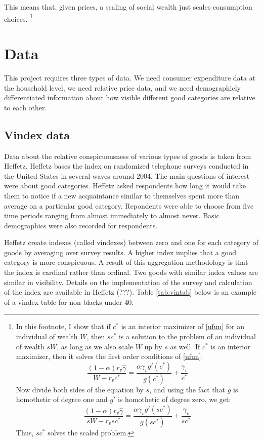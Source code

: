 \documentclass{article}
\begin{document}
This means that, given prices, a scaling of social wealth just scales consumption choices.
\footnote{
In this footnote, I show that if $c^*$ is an interior maximizer of \eqref{ufun} for an individual of wealth $W$, then $s c^*$ is a solution to the  problem of an individual of wealth $s W$, as long as we also scale $\underbar{W}$ up by $s$ as well.
If $c^*$ is an interior maximizer, then it solves the first order conditions of \eqref{ufun}:
\[
\frac{(1-\alpha)r_v \hat{\gamma}}{W-r_v c^*} = \frac{\alpha \gamma_v g'(c^*)}{g(c^*)} + \frac{\gamma_v}{c^*}
\]
Now divide both sides of the equation by $s$, and using the fact that $g$ is homothetic of degree one and $g'$ is homothetic of degree zero, we get:
\[
\frac{(1-\alpha)r_v \hat{\gamma}}{s W-r_v s c^*} = \frac{\alpha \gamma_v g'(s c^*)}{g(s c^*)} + \frac{\gamma_v}{s c^*}
\]
Thus, $s c^*$ solves the scaled problem.
}
\section{Data}
This project requires three types of data.  We need consumer expenditure data at the household level, we need relative price data, and we need demographicly differentiated information about how visible different good categories are relative to each other. 
\subsection{Vindex data}
Data about the relative  conspicuousness of  various types of goods is taken from Heffetz.  
Heffetz bases the index on randomized telephone surveys conducted in the United States in several waves around 2004.
The main questions of interest were about good categories.
Heffetz asked respondents how long it would take them to notice if a new acquaintance similar to themselves spent more than average on a particular good category.
Repondents were able to choose from five time periods ranging from almost immediately to almost never.  
Basic demographics were also recorded for respondents.  

Heffetz create indexes (called vindexes) between zero and one for each category of goods by averaging over survey results.  
A higher index implies that a good category is  more conspicuous. 
A result of this aggregation methodology is that the index is cardinal rather than ordinal.  Two goods with similar index values are similar in visibility.  Details on the implementation of the survey and calculation of the index are available in Heffetz (???).
Table \ref{tab:vintab} below is an example of a vindex table for non-blacks under 40.
\end{document}
